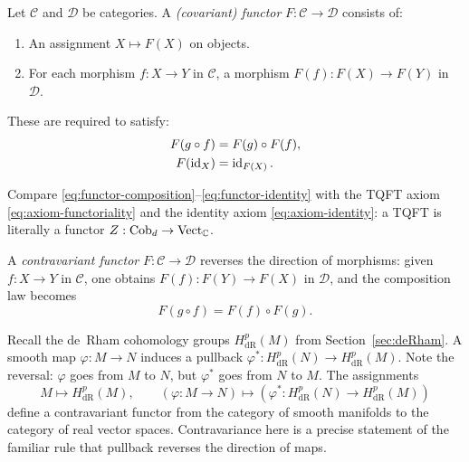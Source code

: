 \begin{definition}\label{def:functor}
Let $\mathcal{C}$ and $\mathcal{D}$ be categories.  A \emph{(covariant) functor} $F : \mathcal{C} \to \mathcal{D}$ consists of:
\begin{enumerate}
\item An assignment $X \mapsto F(X)$ on objects.
\item For each morphism $f : X \to Y$ in $\mathcal{C}$, a morphism $F(f) : F(X) \to F(Y)$ in $\mathcal{D}$.
\end{enumerate}
These are required to satisfy:
\begin{align}
F(g \circ f) &= F(g) \circ F(f), \label{eq:functor-composition} \\
F(\operatorname{id}_X) &= \operatorname{id}_{F(X)}. \label{eq:functor-identity}
\end{align}
\end{definition}

\noindent Compare \eqref{eq:functor-composition}--\eqref{eq:functor-identity} with the TQFT axiom \eqref{eq:axiom-functoriality} and the identity axiom \eqref{eq:axiom-identity}: a TQFT is literally a functor $Z : \mathrm{Cob}_d \to \mathrm{Vect}_{\mathbb{C}}$.

\begin{definition}\label{def:contravariant-functor}
A \emph{contravariant functor} $F : \mathcal{C} \to \mathcal{D}$ reverses the direction of morphisms: given $f : X \to Y$ in $\mathcal{C}$, one obtains $F(f) : F(Y) \to F(X)$ in $\mathcal{D}$, and the composition law becomes
\begin{equation}\label{eq:contravariant-composition}
F(g \circ f) = F(f) \circ F(g).
\end{equation}
\end{definition}

\begin{example}\label{ex:deRham-functor}
Recall the de~Rham cohomology groups $H^p_{\mathrm{dR}}(M)$ from Section~\ref{sec:deRham}.  A smooth map $\varphi : M \to N$ induces a pullback $\varphi^* : H^p_{\mathrm{dR}}(N) \to H^p_{\mathrm{dR}}(M)$.  Note the reversal: $\varphi$ goes from $M$ to $N$, but $\varphi^*$ goes from $N$ to $M$.  The assignments
\begin{equation}\label{eq:deRham-functor-def}
M \longmapsto H^p_{\mathrm{dR}}(M), \qquad (\varphi : M \to N) \longmapsto (\varphi^* : H^p_{\mathrm{dR}}(N) \to H^p_{\mathrm{dR}}(M))
\end{equation}
define a contravariant functor from the category of smooth manifolds to the category of real vector spaces.  Contravariance here is a precise statement of the familiar rule that pullback reverses the direction of maps.
\end{example}

